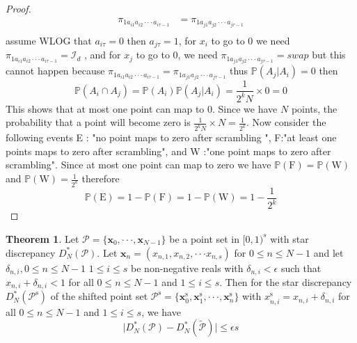 \documentclass{article}
\theoremstyle{definition}
\newtheorem{appendixtheorem}[appendixdefinition]{Theorem}
\begin{document}
\begin{appendices}
\begin{proof}
\begin{align*}
\pi_{1a_{i1}a_{i2}\cdot\cdot\cdot a_{i\tau-1}} &=\pi_{1a_{j1}a_{j2}\cdot\cdot\cdot a_{j\tau-1}} \\
\end{align*}
assume WLOG that $a_{i\tau}=0$ then $a_{j\tau}=1$, for $x_i$ to go to 0 we need $\pi_{1a_{i1}a_{i2}\cdot\cdot\cdot a_{i\tau-1}}=\mathcal{I}_d$ , and for $x_j$ to go to 0, we need $\pi_{1a_{j1}a_{j2}\cdot\cdot\cdot a_{j\tau-1}}=\textit{swap}$ but this cannot happen because $\pi_{1a_{i1}a_{i2}\cdot\cdot\cdot a_{i\tau-1}} =\pi_{1a_{j1}a_{j2}\cdot\cdot\cdot a_{j\tau-1}}$ thus \(\mathbb{P}(A_j|A_i)=0\) then\begin{equation}
    \mathbb{P}(A_i \cap A_j)=\mathbb{P}(A_i)\mathbb{P}(A_j|A_i)=\frac{1}{2^{k}N} \times 0=0
\end{equation}
This shows that at most one point can map to 0.
Since we have $N$ points, the probability that a point will become zero is $\frac{1}{2^{k}N} \times N=\frac{1}{2^{k}}$.
Now consider the following events E : "no point maps to zero after scrambling ", F:"at least one points maps to zero after scrambling", and W :"one point maps to zero after scrambling". Since at most one point can map to zero we have $\mathbb{P}(\text{F})=\mathbb{P}(\text{W})$ and $\mathbb{P}(\text{W})=\frac{1}{2^{k}}$ therefore  \begin{equation}
\mathbb{P}(\text{E})=1-\mathbb{P}(\text{F})
=1-\mathbb{P}(\text{W}) 
=1-\frac{1}{2^{k}}
\end{equation}
\end{proof}
\begin{appendixtheorem}
  \label{th:shift}
Let $\mathcal{P}=\{\mathbf{x}_0,\cdot\cdot\cdot,\mathbf{x}_{N-1}\}$ be a point set in $[0,1)^s$ with star discrepancy $D_N^{\ast}(\mathcal{P})$. Let $\mathbf{x}_n=(x_{n,1},x_{n,2},\cdot\cdot\cdot x_{n,s})$ for $0\leq n\leq N-1$ and let $\delta_{n,i}, 0\leq n\leq N-1$ $1\leq i\leq s$ be non-negative reals with $\delta_{n,i}<\epsilon$ such that $x_{n,i} + \delta_{n,i}<1$ for all $0\leq n\leq N-1$ and  $1\leq i\leq s$. Then for the star discrepancy $D_N^{\ast}(\mathcal{P}^{\text{s}})$ of the shifted point set $\mathcal{P}^{\text{s}}=\{\mathbf{x}^{\text{s}}_0,\mathbf{x}^{\text{s}}_1,\cdot\cdot\cdot, \mathbf{x}^{\text{s}}_n\}$ with ${x}^{\text{s}}_{n,i}=x_{n,i}+\delta_{n,i}$ for all $0\leq n\leq N-1$ and  $1\leq i\leq s$, we have \begin{equation}
\lvert D_N^{\ast}(\mathcal{P}) - D_N^{\ast}(\widetilde{\mathcal{P}})\rvert \leq \epsilon s
\end{equation}
\end{appendixtheorem}

\end{appendices}
\end{document}
